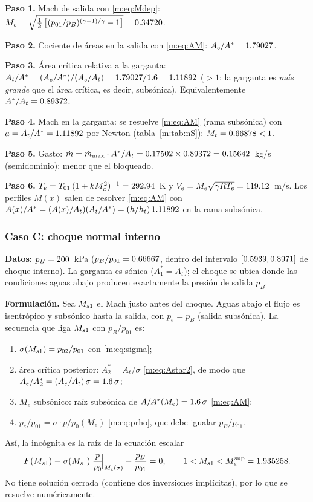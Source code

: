 \textbf{Paso 1.} Mach de salida con \eqref{m:eq:Mdep}: $M_e=\sqrt{\tfrac{1}{k}\left[(p_{01}/p_B)^{(\gamma-1)/\gamma}-1\right]}=0.34720$.

\textbf{Paso 2.} Cociente de áreas en la salida con \eqref{m:eq:AM}: $A_e/A^{*}=1.79027$.

\textbf{Paso 3.} Área crítica relativa a la garganta: $A_t/A^{*}=(A_e/A^{*})/(A_e/A_t)=1.79027/1.6=1.11892$ ($>1$:
la garganta es \emph{más grande} que el área crítica, es decir, subsónica). Equivalentemente $A^{*}/A_t=0.89372$.

\textbf{Paso 4.} Mach en la garganta: se resuelve \eqref{m:eq:AM} (rama subsónica) con $a=A_t/A^{*}=1.11892$ por Newton (tabla~\ref{m:tab:nS}): $M_t=0.66878<1$.

\textbf{Paso 5.} Gasto: $\dot m=\dot m_{\rm max}\cdot A^{*}/A_t=0.17502\times0.89372=0.15642$~kg/s (semidominio): menor que el bloqueado.

\textbf{Paso 6.} $T_e=T_{01}\,(1+kM_e^2)^{-1}=292.94$~K y $V_e=M_e\sqrt{\gamma RT_e}=119.12$~m/s. Los perfiles $M(x)$ salen de resolver \eqref{m:eq:AM}
con $A(x)/A^{*}=(A(x)/A_t)(A_t/A^{*})=(h/h_t)\,1.11892$ en la rama subsónica.

\begin{table}[H]\centering\small
\caption{Newton para $M_t$ del caso S ($A/\As=\AtAsS$, $M_0=0.5$).}\label{m:tab:nS}
\end{table}

\subsubsection{Caso C: choque normal interno}
\textbf{Datos:} $p_B=200$~kPa ($p_B/p_{01}=0.66667$, dentro del intervalo $[0.5939,0.8971]$ de choque interno). La garganta es sónica
($A^*_1=A_t$); el choque se ubica donde las condiciones aguas abajo producen exactamente la presión de salida $p_B$.

\textbf{Formulación.} Sea $M_{s1}$ el Mach justo antes del choque. Aguas abajo el flujo es isentrópico y subsónico hasta la salida, con $p_e=p_B$ (salida subsónica).
La secuencia que liga $M_{s1}$ con $p_B/p_{01}$ es:
\begin{enumerate}[label=(\roman*)]
\item $\sigma(M_{s1})=p_{02}/p_{01}$ con \eqref{m:eq:sigma};
\item área crítica posterior: $A^*_2=A_t/\sigma$ \eqref{m:eq:Astar2}, de modo que $A_e/A^*_2=(A_e/A_t)\,\sigma=1.6\,\sigma$;
\item $M_e$ subsónico: raíz subsónica de $A/A^{*}(M_e)=1.6\,\sigma$ \eqref{m:eq:AM};
\item $p_e/p_{01}=\sigma\cdot p/p_0(M_e)$ \eqref{m:eq:prho}, que debe igualar $p_B/p_{01}$.
\end{enumerate}
Así, la incógnita es la raíz de la ecuación escalar
\begin{equation}
F(M_{s1})\equiv\sigma(M_{s1})\;\frac{p}{p_0}\!\Big|_{M_e(\sigma)}-\frac{p_B}{p_{01}}=0,\qquad 1<M_{s1}<M_e^{\rm sup}=1.935258. \label{m:eq:F}
\end{equation}
No tiene solución cerrada (contiene dos inversiones implícitas), por lo que se resuelve numéricamente.


